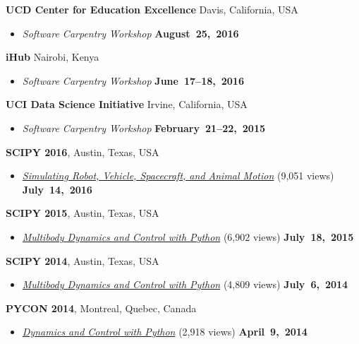 \documentclass[10pt]{article}
\newenvironment{outerlist}[1][\enskip\textbullet]%
        {\begin{itemize}[#1]}{\end{itemize}%
         \vspace{-.6\baselineskip}}
\newcommand{\blankline}{\quad\pagebreak[2]}
\begin{document}
\blankline

\textbf{UCD Center for Education Excellence} Davis, California, USA
\begin{outerlist}
  \item[] \textit{Software Carpentry Workshop}
    \hfill \textbf{August~25,~2016}
\end{outerlist}

\blankline

\textbf{iHub} Nairobi, Kenya
\begin{outerlist}
  \item[] \textit{Software Carpentry Workshop}
    \hfill \textbf{June~17--18,~2016}
\end{outerlist}

\blankline

\textbf{UCI Data Science Initiative} Irvine, California, USA
\begin{outerlist}
  \item[] \textit{ Software Carpentry Workshop}
    \hfill \textbf{February~21--22,~2015}
\end{outerlist}

\blankline

\textbf{SCIPY 2016}, Austin, Texas, USA
\begin{outerlist}
  \item[] \href{https://youtu.be/r4piIKV4sDw}{\textit{Simulating Robot,
    Vehicle, Spacecraft, and Animal Motion}} (9,051 views)
    \hfill \textbf{July~14,~2016}
\end{outerlist}

\blankline

\textbf{SCIPY 2015}, Austin, Texas, USA
\begin{outerlist}
  \item[] \href{https://youtu.be/mdo2NYtA-xY}{\textit{Multibody Dynamics and
    Control with Python}} (6,902 views)
    \hfill \textbf{July~18,~2015}
\end{outerlist}

\blankline

\textbf{SCIPY 2014}, Austin, Texas, USA
\begin{outerlist}
  \item[] \href{https://youtu.be/lWbeuDwYVto}{\textit{Multibody Dynamics and
    Control with Python}} (4,809 views) \hfill \textbf{July~6,~2014}
\end{outerlist}

\blankline

\textbf{PYCON 2014}, Montreal, Quebec, Canada
\begin{outerlist}
  \item[] \href{https://youtu.be/IoMR-ESzqw8}{\textit{Dynamics and Control with
    Python}} (2,918 views)
    \hfill \textbf{April~9,~2014}
\end{outerlist}
\end{document}
